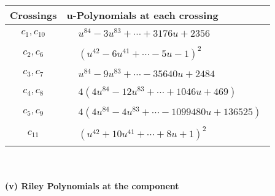 \documentclass[1p]{elsarticle_modified}
\theoremstyle{definition}
\begin{document}
\begin{tabular}{m{50pt}|m{274pt}}
Crossings & \hspace{64pt}u-Polynomials at each crossing \\
\hline $$\begin{aligned}c_{1},c_{10}\end{aligned}$$&$\begin{aligned}
&u^{84}-3 u^{83}+\cdots+3176 u+2356
\end{aligned}$\\
\hline $$\begin{aligned}c_{2},c_{6}\end{aligned}$$&$\begin{aligned}
&(u^{42}-6 u^{41}+\cdots-5 u-1)^{2}
\end{aligned}$\\
\hline $$\begin{aligned}c_{3},c_{7}\end{aligned}$$&$\begin{aligned}
&u^{84}-9 u^{83}+\cdots-35640 u+2484
\end{aligned}$\\
\hline $$\begin{aligned}c_{4},c_{8}\end{aligned}$$&$\begin{aligned}
&4(4 u^{84}-12 u^{83}+\cdots+1046 u+469)
\end{aligned}$\\
\hline $$\begin{aligned}c_{5},c_{9}\end{aligned}$$&$\begin{aligned}
&4(4 u^{84}-4 u^{83}+\cdots-1099480 u+136525)
\end{aligned}$\\
\hline $$\begin{aligned}c_{11}\end{aligned}$$&$\begin{aligned}
&(u^{42}+10 u^{41}+\cdots+8 u+1)^{2}
\end{aligned}$\\
\hline
\end{tabular}\\~\\
\newpage\renewcommand{\arraystretch}{1}
\flushleft \textbf{(v) Riley Polynomials at the component}\newline \\
\end{document}
